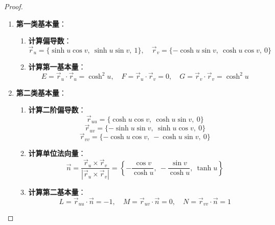 \documentclass[lang=cn,10pt,thmcnt=section]{elegantbook}
\begin{document}
\begin{proof}

	
	\begin{enumerate}
		\item \textbf{第一类基本量}：
		\begin{enumerate}
			\item \textbf{计算偏导数}：
			\[
				\vec{r}_u = \{\sinh u \cos v,\ \sinh u \sin v,\ 1\}, \quad 
				\vec{r}_v = \{-\cosh u \sin v,\ \cosh u \cos v,\ 0\}
			\]
			
			\item \textbf{计算第一基本量}：
			\[
				E = \vec{r}_u \cdot \vec{r}_u = \cosh^2 u, \quad 
				F = \vec{r}_u \cdot \vec{r}_v = 0, \quad 
				G = \vec{r}_v \cdot \vec{r}_v = \cosh^2 u
			\]
		\end{enumerate}
		
		\item \textbf{第二类基本量}：
		\begin{enumerate}
			\item \textbf{计算二阶偏导数}：
			\[
				\vec{r}_{uu} = \{\cosh u \cos v,\ \cosh u \sin v,\ 0\}
			\]
			\[
				\vec{r}_{uv} = \{-\sinh u \sin v,\ \sinh u \cos v,\ 0\}
			\]
			\[
				\vec{r}_{vv} = \{-\cosh u \cos v,\ -\cosh u \sin v,\ 0\}
			\]
			
			\item \textbf{计算单位法向量}：
			\[
				\vec{n} = \frac{\vec{r}_u \times \vec{r}_v}{|\vec{r}_u \times \vec{r}_v|} = \left\{ -\frac{\cos v}{\cosh u},\ -\frac{\sin v}{\cosh u},\ \tanh u \right\}
			\]
			
			\item \textbf{计算第二基本量}：
			\[
				L = \vec{r}_{uu} \cdot \vec{n} = -1, \quad 
				M = \vec{r}_{uv} \cdot \vec{n} = 0, \quad 
				N = \vec{r}_{vv} \cdot \vec{n} = 1
			\]
		\end{enumerate}
	\end{enumerate}
	
\end{proof}
\end{document}
